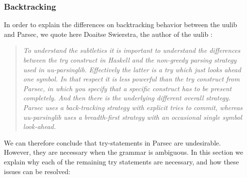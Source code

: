 \subsubsection{Backtracking}
\label{design:backtracking}
In order to explain the differences on backtracking behavior between the uulib and Parsec, we quote here Doaitse Swierstra, the author of the uulib :
\begin{quote}
\textsl{
  To understand the subtleties it is important to understand the differences between the try construct in Haskell and the non-greedy parsing strategy used in uu-parsinglib.
  Effectively the latter is a try which just looks ahead one symbol.
  In that respect it is less powerful than the try construct from Parsec, in which you specify that a specific construct has to be present completely.
  And then there is the underlying different overall strategy.
  Parsec uses a back-tracking strategy with explicit tries to commit, whereas uu-parsinglib uses a breadth-first strategy with an occasional single symbol look-ahead.
}
\end{quote}
%
We can therefore conclude that try-statements in Parsec are undesirable.
However, they are necessary when the grammar is ambiguous.
In this section we explain why each of the remaining try statements are necessary, and how these issues can be resolved:
